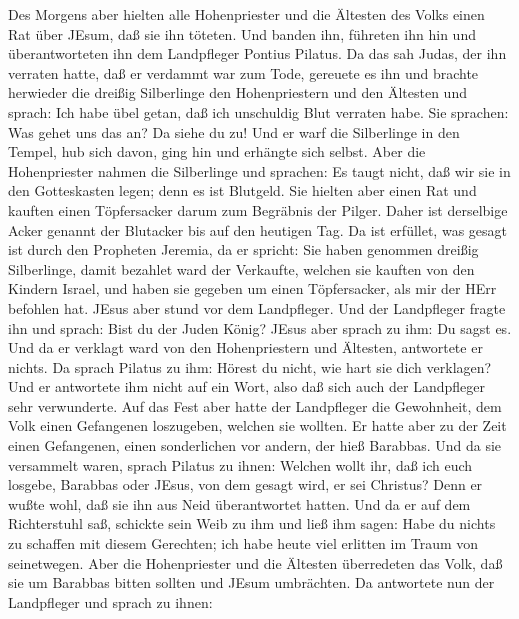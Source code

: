  Des Morgens aber hielten alle Hohenpriester und die
Ältesten des Volks einen Rat über JEsum, daß sie ihn töteten.
 Und banden ihn, führeten ihn hin und überantworteten ihn
dem Landpfleger Pontius Pilatus.  Da das sah Judas, der ihn
verraten hatte, daß er verdammt war zum Tode, gereuete es ihn und
brachte herwieder die dreißig Silberlinge den Hohenpriestern und den
Ältesten  und sprach: Ich habe übel getan, daß ich
unschuldig Blut verraten habe.  Sie sprachen: Was gehet uns
das an? Da siehe du zu! Und er warf die Silberlinge in den Tempel, hub
sich davon, ging hin und erhängte sich selbst.  Aber die
Hohenpriester nahmen die Silberlinge und sprachen: Es taugt nicht, daß
wir sie in den Gotteskasten legen; denn es ist Blutgeld. 
Sie hielten aber einen Rat und kauften einen Töpfersacker darum zum
Begräbnis der Pilger.  Daher ist derselbige Acker genannt
der Blutacker bis auf den heutigen Tag.  Da ist erfüllet,
was gesagt ist durch den Propheten Jeremia, da er spricht: Sie haben
genommen dreißig Silberlinge, damit bezahlet ward der Verkaufte, welchen
sie kauften von den Kindern Israel,  und haben sie gegeben
um einen Töpfersacker, als mir der HErr befohlen hat. 
JEsus aber stund vor dem Landpfleger. Und der Landpfleger fragte ihn und
sprach: Bist du der Juden König? JEsus aber sprach zu ihm: Du sagst es.
 Und da er verklagt ward von den Hohenpriestern und
Ältesten, antwortete er nichts.  Da sprach Pilatus zu ihm:
Hörest du nicht, wie hart sie dich verklagen?  Und er
antwortete ihm nicht auf ein Wort, also daß sich auch der Landpfleger
sehr verwunderte.  Auf das Fest aber hatte der Landpfleger
die Gewohnheit, dem Volk einen Gefangenen loszugeben, welchen sie
wollten.  Er hatte aber zu der Zeit einen Gefangenen, einen
sonderlichen vor andern, der hieß Barabbas.  Und da sie
versammelt waren, sprach Pilatus zu ihnen: Welchen wollt ihr, daß ich
euch losgebe, Barabbas oder JEsus, von dem gesagt wird, er sei Christus?
 Denn er wußte wohl, daß sie ihn aus Neid überantwortet
hatten.  Und da er auf dem Richterstuhl saß, schickte sein
Weib zu ihm und ließ ihm sagen: Habe du nichts zu schaffen mit diesem
Gerechten; ich habe heute viel erlitten im Traum von seinetwegen.
 Aber die Hohenpriester und die Ältesten überredeten das
Volk, daß sie um Barabbas bitten sollten und JEsum umbrächten.
 Da antwortete nun der Landpfleger und sprach zu ihnen:
